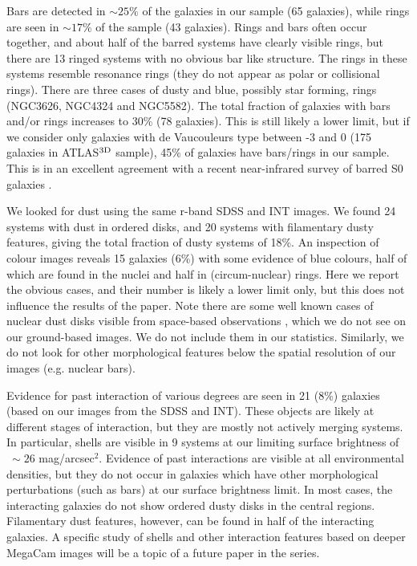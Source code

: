\documentclass[usenatbib,usegraphicx]{mn2e}
\begin{document}
Bars are detected in $\sim25\%$ of the galaxies in our sample (65 galaxies), while rings are seen in $\sim17\%$ of the sample (43 galaxies). Rings and bars often occur together, and about half of the barred systems have clearly visible rings, but there are 13 ringed systems with no obvious bar like structure. The rings in these systems resemble resonance rings (they do not appear as polar or collisional rings). There are three cases of dusty and blue, possibly star forming, rings (NGC3626, NGC4324 and NGC5582). The total fraction of galaxies with bars and/or rings increases to 30\% (78 galaxies). This is still likely a lower limit, but if we consider only galaxies with de Vaucouleurs type between -3 and 0 (175 galaxies in ATLAS$^{\rm 3D}$ sample), 45\% of galaxies have bars/rings in our sample.  This is in an excellent agreement with a recent near-infrared survey of barred S0 galaxies \citep{2009ApJ...692L..34L}.

We looked for dust using the same r-band SDSS and INT images. We found 24 systems with dust in ordered disks, and 20 systems with filamentary dusty features, giving the total fraction of dusty systems of 18\%.  An inspection of colour images reveals 15 galaxies (6\%) with some evidence of blue colours, half of which are found in the nuclei and half in (circum-nuclear) rings. Here we report the obvious cases, and their number is likely a lower limit only, but this does not influence the results of the paper. Note there are some well known cases of nuclear dust disks visible from space-based observations \citep[e.g. NGC4261,][]{1996ApJ...460..214J}, which we do not see on our ground-based images. We do not include them in our statistics. Similarly, we do not look for other morphological features below the spatial resolution of our images (e.g. nuclear bars). 

Evidence for past interaction of various degrees are seen in 21 (8\%) galaxies (based on our images from the SDSS and INT). These objects are likely at different stages of interaction, but they are mostly not actively merging systems. In particular, shells are visible in 9 systems at our limiting surface brightness of $~\sim26$ mag/arcsec$^2$. Evidence of past interactions are visible at all environmental densities, but they do not  occur in galaxies which have other morphological perturbations (such as bars) at our surface brightness limit. In most cases, the interacting galaxies do not show ordered dusty disks in the central regions. Filamentary dust features, however, can be found in half of the interacting galaxies. A specific study of shells and other interaction features based on deeper MegaCam images will be a topic of a future paper in the series. 
\end{document}
